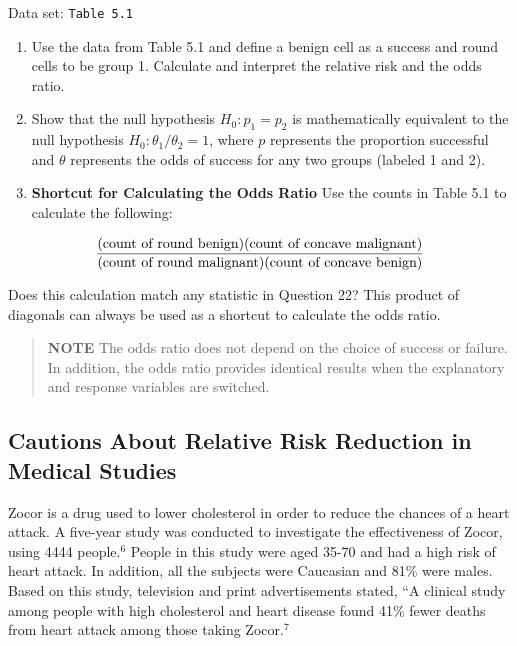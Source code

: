 \documentclass[
]{book}
\begin{document}
Data set: \texttt{Table\ 5.1}

\begin{enumerate}
\def\labelenumi{\arabic{enumi}.}
\setcounter{enumi}{21}
\item
  Use the data from Table 5.1 and define a benign cell as a success and round cells to be group 1. Calculate and interpret the relative risk and the odds ratio.
\item
  Show that the null hypothesis \(H_0: p_1 = p_2\) is mathematically equivalent to the null hypothesis \(H_0: \theta_1/\theta_2 = 1\), where \(p\) represents the proportion successful and \(\theta\) represents the odds of success for any two groups (labeled 1 and 2).
\item
  \textbf{Shortcut for Calculating the Odds Ratio} Use the counts in Table 5.1 to calculate the following:
\end{enumerate}

\begin{align}
\frac{\text{(count of round benign)(count of concave malignant)}}{\text{(count of round malignant)(count of concave benign)}}
\notag
\end{align}

Does this calculation match any statistic in Question 22? This product of diagonals can always be used as a shortcut to calculate the odds ratio.

\begin{quote}
\textbf{NOTE} The odds ratio does not depend on the choice of success or failure. In addition, the odds ratio provides identical results when the explanatory and response variables are switched.
\end{quote}

\hypertarget{cautions-about-relative-risk-reduction-in-medical-studies}{%
\subsection*{Cautions About Relative Risk Reduction in Medical Studies}\label{cautions-about-relative-risk-reduction-in-medical-studies}}

Zocor is a drug used to lower cholesterol in order to reduce the chances of a heart attack. A five-year study was conducted to investigate the effectiveness of Zocor, using 4444 people.\(^6\) People in this study were aged 35-70 and had a high risk of heart attack. In addition, all the subjects were Caucasian and 81\% were males. Based on this study, television and print advertisements stated, ``A clinical study among people with high cholesterol and heart disease found 41\% fewer deaths from heart attack among those taking Zocor.\(^7\)
\end{document}
